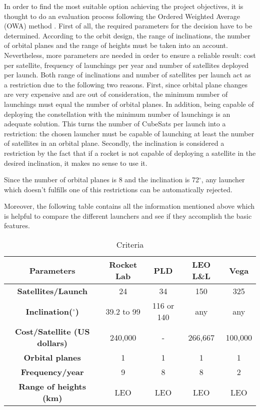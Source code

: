 In order to find the most suitable option achieving the project objectives, it is thought to do an evaluation process following the Ordered Weighted Average (OWA) method . First of all, the required parameters for the decision have to be determined. According to the orbit design, the range of inclinations, the number of orbital planes and the range of heights must be taken into an account. Nevertheless, more parameters are needed in order to ensure a reliable result: cost per satellite, frequency of launchings per year and number of satellites deployed per launch. Both range of inclinations and number of satellites per launch act as a restriction due to the following two reasons. First, since orbital plane changes are very expensive and are out of consideration, the minimum number of launchings must equal the number of orbital planes. In addition, being capable of deploying the constellation with the minimum number of launchings is an adequate solution. This turns the number of CubeSats per launch into a restriction: the chosen launcher must be capable of launching at least the number of satellites in an orbital plane. Secondly, the inclination is considered a restriction by the fact that if a rocket is not capable of deploying a satellite in the desired inclination, it makes no sense to use it. 

Since the number of orbital planes is 8 and the inclination is 72$^{\circ}$, any launcher which doesn't fulfills one of this restrictions can be automatically rejected. 

Moreover, the following table contains all the information mentioned above which is helpful to compare the different launchers and see if they accomplish the basic features. 

\begin{table}[h]
\begin{center}
\begin{tabular}{|c|c|c|c|c|}
\hline
\bf{Parameters} & \bf{Rocket Lab} & \bf{PLD} & \bf{LEO L\&L} & \bf{Vega}\\
\hline 
\bf{Satellites/Launch} & 24 & 34 & 150 & 325 \\
\hline 
\bf{Inclination($^{\circ}$) } & {39.2 to 99} & {116 or 140} & {any} & {any}\\
\hline 
\bf{Cost/Satellite (US dollars)} & 240,000 & - & 266,667 & 100,000\\
\hline 
\bf{Orbital planes} & 1 & 1 & 1 & 1 \\
\hline 
\bf{Frequency/year} & 9 & 8 & 8 & 2 \\
\hline 
\bf{Range of heights (km)} & LEO & LEO & LEO & LEO\\
\hline
\end{tabular}
\end{center}
\caption{Criteria}
\end{table} 

